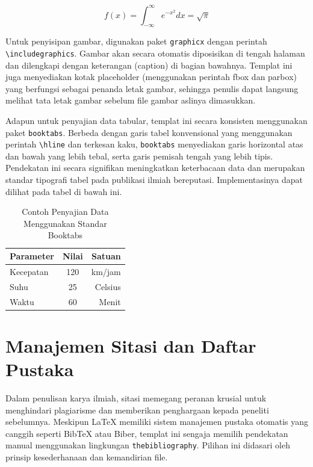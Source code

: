 \documentclass[11pt,a4paper]{article}
\begin{document}
	\begin{equation}
		f(x) = \int_{-\infty}^{\infty} e^{-x^2} dx = \sqrt{\pi}
	\end{equation}
	
	Untuk penyisipan gambar, digunakan paket \texttt{graphicx} dengan perintah \texttt{\textbackslash includegraphics}. Gambar akan secara otomatis diposisikan di tengah halaman dan dilengkapi dengan keterangan (caption) di bagian bawahnya. Templat ini juga menyediakan kotak placeholder (menggunakan perintah fbox dan parbox) yang berfungsi sebagai penanda letak gambar, sehingga penulis dapat langsung melihat tata letak gambar sebelum file gambar aslinya dimasukkan.
	
	Adapun untuk penyajian data tabular, templat ini secara konsisten menggunakan paket \texttt{booktabs}. Berbeda dengan garis tabel konvensional yang menggunakan perintah \texttt{\textbackslash hline} dan terkesan kaku, \texttt{booktabs} menyediakan garis horizontal atas dan bawah yang lebih tebal, serta garis pemisah tengah yang lebih tipis. Pendekatan ini secara signifikan meningkatkan keterbacaan data dan merupakan standar tipografi tabel pada publikasi ilmiah bereputasi. Implementasinya dapat dilihat pada tabel di bawah ini.
	
	\begin{table}[htbp]
		\centering
		\caption{Contoh Penyajian Data Menggunakan Standar Booktabs}
		\label{tab:contoh_tabel}
		\begin{tabular}{lcr}
			\toprule
			\textbf{Parameter} & \textbf{Nilai} & \textbf{Satuan} \\
			\midrule
			Kecepatan & 120 & km/jam \\
			Suhu & 25 & Celsius \\
			Waktu & 60 & Menit \\
			\bottomrule
		\end{tabular}
	\end{table}
	
	\section{Manajemen Sitasi dan Daftar Pustaka}
	
	Dalam penulisan karya ilmiah, sitasi memegang peranan krusial untuk menghindari plagiarisme dan memberikan penghargaan kepada peneliti sebelumnya. Meskipun LaTeX memiliki sistem manajemen pustaka otomatis yang canggih seperti BibTeX atau Biber, templat ini sengaja memilih pendekatan manual menggunakan lingkungan \texttt{thebibliography}. Pilihan ini didasari oleh prinsip kesederhanaan dan kemandirian file.
	
\end{document}
